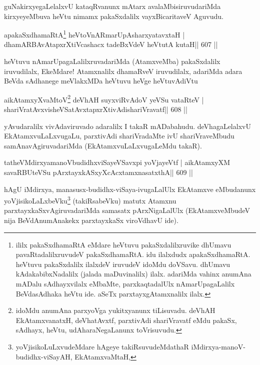 \begin{artha}
guNakirxyegaLelalxvU kataqRvanunx mAtarx avalaMbisiruvudariMda kirxye\-yeMbuva heVtu nimamx pakaSxdalilx vayxBicaritaveV Aguvudu.
\end{artha}


\begin{shl}
apakaSxdhamaRtA\footnote{ililx pakaSxdhamaRtA eMdare heVtuvu pakaSxdalilxruvike dhUmavu pavaRtadalilxruvudeV pakaSx\-dhamaRtA. idu ilalxdudx apakaSxdhamaRtA. heVtuvu pakaSxdalilx ilalxdeV   iruvudeV idoMdu doVSavu. dhUmavu kAdakabibxNadalilx (jalada   maDuvinalilx) ilalx. adariMda vahinx anumAna mADalu sAdhayxvilalx   eMbaMte, parxkaqtadalUlx nAmarUpagaLalilx BeVdasAdhaka heVtu   ide. aSeTx parxtayxgAtamxnalilx ilalx.} heVtoVnARmarUpAsharxyatavxtaH |
dhamARBAvAtapxrXtiVcashacx tadeBxVdeV heVtutA kutaH\hfill || 607 ||
\end{shl}

\begin{artha}
heVtuvu nAmarUpagaLalilxruvadariMda (AtamxveMba) pakaSxdalilx
iruvudilalx, EkeMdare! Atamxnalilx dhamaRveV iruvudilalx, adariMda
adara BeVda sAdhanege meVlakxMDa heVtuvu heVge heVtuvAdiVtu
\end{artha}

\begin{shl}
aikAtamxyXvaMtoV\footnote{idoMdu anumAna parxyoVga yukitxyanunx tiLisuvadu. deVhAH EkAtamxvanatxH, deVhatAvxtf, parxtivAdi shariVravatf eMdu pakaSx, sAdhayx, heVtu, udAharaNegaLanunx toVrisuvudu.\label{shl608label}} deVhAH suyxviRvAdoV yeVSu vataRteV |
shariVratAvxvisheVSatAvxtapxrXtivAdishariVravatf\hfill || 608 ||
\end{shl}

\begin{artha}
yAvudaralilx vivAdaviruvado adaralilx I takaR mADabahudu. deVhagaLelalxvU EkAtamxvuLaLxvugaLu, parxtivAdi shariVradaMte ivU shariVraveMbudu samAnavAgiruvadariMda (EkAtamxvuLaLxvugaLeMdu takaR).
\end{artha}

\begin{shl}
tatheVMdirxyamanoVbudidhxviSayeVSavxpi yoVjayeVtf |
aikAtamxyXM savaRBUteVSu pArxtayxkASxyXcAcx\s\s tamxnasatxthA\hfill || 609 ||
\end{shl}

\begin{artha}
hAgU iMdirxya, manasusx-budidhx-viSaya-ivugaLalUlx EkAtamxve eMbudanunx yoVjisikoLaLxbeVku\footnote{yoVjisikoLuLxvudeMdare hAgeye takiRsuvudeMdathaR iMdirxya-manoV-budidhx-\break viSayAH, EkAtamxvaMtaH,} (takiRsabeVku) matutx Atamxnu parxtayxkaSxvAgiruvadariMda samasatx pArxNigaLalUlx (EkAtamxveMbudeV nija  BeVdAnumAnakekx parxtayxkaSx viroVdhavU ide).
\end{artha}

